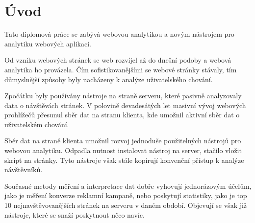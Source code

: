 \documentclass[bc,male,java,dept456]{diploma}						%
\begin{document}
\MakeTitlePages

\tableofcontents
\cleardoublepage	%

\listoftables
\cleardoublepage	%

\listoffigures
\cleardoublepage	%


\lstlistoflistings
\cleardoublepage	%










\section{Úvod}
\label{sec:Uvod}


Tato diplomová práce se zabývá webovou analytikou a novým nástrojem pro analytiku webových aplikací. 

Od vzniku webových stránek se web rozvíjel až do dnešní podoby a webová a\-na\-ly\-ti\-ka\cite{kaushik} ho provázela. Čím sofistikovanějšími se webové stránky stávaly, tím důmyslnější způsoby byly nacházeny k analýze uživatelského chování.

Zpočátku byly používány nástroje na straně serveru, které pasivně analyzovaly data o návštěvách stránek. V polovině devadesátých let masivní vývoj webových prohlížečů přesunul sběr dat na stranu klienta, kde umožnil aktivní sběr dat o uživatelském chování.

Sběr dat na straně klienta umožnil rozvoj jednoduše použitelných nástrojů pro webovou analytiku. Odpadla nutnost instalovat nástroj na server, stačilo vložit skript na stránky. Tyto nástroje však stále kopírují konvenční přístup k analýze návštěvníků.

Současné metody měření a interpretace dat dobře vyhovují jednorázovým účelům, jako je měření konverze reklamní kampaně, nebo poskytují statistiky, jako je top 10 nejnavštěvovanějších stránek na serveru v daném období. Objevují se však již nástroje, které se snaží poskytnout něco navíc.
\end{document}
